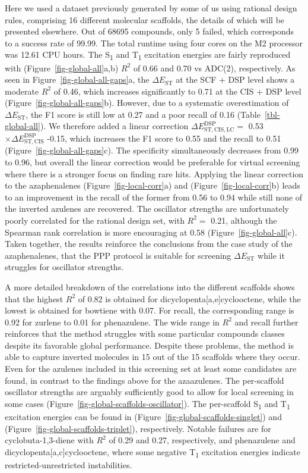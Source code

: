\documentclass[
  number,
  3p]{elsarticle}
\newcommand{\DeltaE}[2][]{\Delta E^{\mathrm{#1}}_{\mathrm{#2}}}
\newcommand{\DeltaEST}[2][]{\Delta E^{\mathrm{#1}}_{\mathrm{ST,#2}}}
\begin{document}
Here we used a dataset previously generated by some of us using rational
design rules, comprising 16 different molecular scaffolds, the details
of which will be presented elsewhere. Out of 68695 compounds, only 5
failed, which corresponds to a success rate of 99.99. The total runtime
using four cores on the M2 processor was 12.61 CPU hours. The
S\textsubscript{1} and T\textsubscript{1} excitation energies are fairly
reproduced with (Figure~\ref{fig-global-all}a,b) \(R^2\) of 0.66 and
0.70 vs ADC(2), respectively. As seen in
Figure~\ref{fig-global-all-gaps}a, the \(\DeltaE{ST}\) at the SCF + DSP
level shows a moderate \(R^2\) of 0.46, which increases significantly to
0.71 at the CIS + DSP level (Figure~\ref{fig-global-all-gaps}b).
However, due to a systematic overestimation of \(\DeltaE{ST}\), the F1
score is still low at 0.27 and a poor recall of 0.16
(Table~\ref{tbl-global-all}). We therefore added a linear correction
\(\DeltaEST[DSP]{CIS,LC}=\) 0.53 \(\times\DeltaEST[DSP]{CIS}\) -0.15,
which increases the F1 score to 0.55 and the recall to 0.51
(Figure~\ref{fig-global-all-gaps}c). The specificity simultaneously
decreases from 0.99 to 0.96, but overall the linear correction would be
preferable for virtual screening where there is a stronger focus on
finding rare hits. Applying the linear correction to the azaphenalenes
(Figure~\ref{fig-local-corr}a) and (Figure~\ref{fig-local-corr}b) leads
to an improvement in the recall of the former from 0.56 to 0.94 while
still none of the inverted azulenes are recovered. The oscillator
strengths are unfortunately poorly correlated for the rational design
set, with \(R^2=\) 0.21, although the Spearman rank correlation is more
encouraging at 0.58 (Figure~\ref{fig-global-all}c). Taken together, the
results reinforce the conclusions from the case study of the
azaphenalenes, that the PPP protocol is suitable for screening
\(\DeltaE{ST}\) while it struggles for oscillator strengths.

A more detailed breakdown of the correlations into the different
scaffolds shows that the highest \(R^2\) of 0.82 is obtained for
dicyclopenta{[}a,e{]}cyclooctene, while the lowest is obtained for
bowtiene with 0.07. For recall, the corresponding range is 0.92 for
zurlene to 0.01 for phenazulene. The wide range in \(R^2\) and recall
further reinforces that the method struggles with some particular
compounds classes despite its favorable global performance. Despite
these problems, the method is able to capture inverted molecules in 15
out of the 15 scaffolds where they occur. Even for the azulenes included
in this screening set at least some candidates are found, in contrast to
the findings above for the azaazulenes. The per-scaffold oscillator
strengths are arguably sufficiently good to allow for local screening in
some cases (Figure~\ref{fig-global-scaffolds-oscillator}). The
per-scaffold S\textsubscript{1} and T\textsubscript{1} excitation
energies can be found in (Figure~\ref{fig-global-scaffolds-singlet}) and
(Figure~\ref{fig-global-scaffolds-triplet}), respectively. Notable
failures are for cyclobuta-1,3-diene with \(R^2\) of 0.29 and 0.27,
respectively, and phenazulene and dicyclopenta{[}a,c{]}cyclooctene,
where some negative T\textsubscript{1} excitation energies indicate
restricted-unrestricted instabilities.
\end{document}
